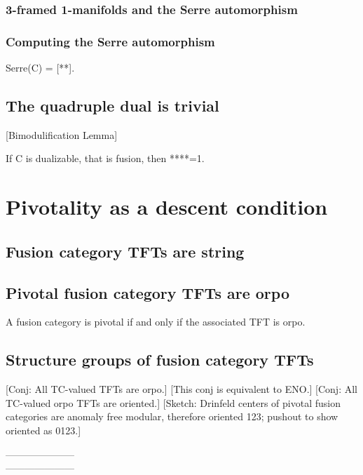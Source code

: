\documentclass{amsart}
\begin{document}
\subsubsection{3-framed 1-manifolds and the Serre automorphism}

\subsubsection{Computing the Serre automorphism}
\begin{theorem}
Serre(C) = [**].
\end{theorem}

\subsection{The quadruple dual is trivial}

[Bimodulification Lemma]

\begin{theorem} 
If C is dualizable, that is fusion, then ****=1.
\end{theorem}





\section{Pivotality as a descent condition}

\subsection{Fusion category TFTs are string}

\subsection{Pivotal fusion category TFTs are orpo}

\begin{theorem}
A fusion category is pivotal if and only if the associated TFT is orpo.
\end{theorem}

\subsection{Structure groups of fusion category TFTs}
   [Conj: All TC-valued TFTs are orpo.] [This conj is equivalent to ENO.]
   [Conj: All TC-valued orpo TFTs are oriented.] [Sketch: Drinfeld centers of pivotal fusion categories are anomaly free modular, therefore oriented 123; pushout to show oriented as 0123.]



\nid ---------------------\\
---------------------




\end{document}

